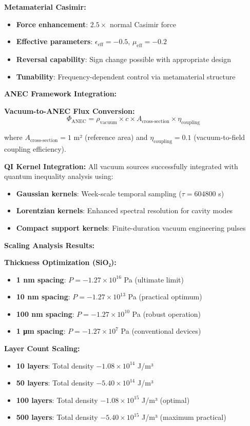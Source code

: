 \documentclass[11pt]{article}
\begin{document}
\textbf{Metamaterial Casimir:}
\begin{itemize}
    \item \textbf{Force enhancement}: $2.5 \times$ normal Casimir force
    \item \textbf{Effective parameters}: $\epsilon_{\text{eff}} = -0.5$, $\mu_{\text{eff}} = -0.2$
    \item \textbf{Reversal capability}: Sign change possible with appropriate design
    \item \textbf{Tunability}: Frequency-dependent control via metamaterial structure
\end{itemize}

\textbf{ANEC Framework Integration:}

\textbf{Vacuum-to-ANEC Flux Conversion:}
$$\Phi_{\text{ANEC}} = \rho_{\text{vacuum}} \times c \times A_{\text{cross-section}} \times \eta_{\text{coupling}}$$

where $A_{\text{cross-section}} = 1$ m² (reference area) and $\eta_{\text{coupling}} = 0.1$ (vacuum-to-field coupling efficiency).

\textbf{QI Kernel Integration:} All vacuum sources successfully integrated with quantum inequality analysis using:
\begin{itemize}
    \item \textbf{Gaussian kernels}: Week-scale temporal sampling ($\tau = 604800$ s)
    \item \textbf{Lorentzian kernels}: Enhanced spectral resolution for cavity modes
    \item \textbf{Compact support kernels}: Finite-duration vacuum engineering pulses
\end{itemize}

\textbf{Scaling Analysis Results:}

\textbf{Thickness Optimization (SiO₂):}
\begin{itemize}
    \item \textbf{1 nm spacing}: $P = -1.27 \times 10^{16}$ Pa (ultimate limit)
    \item \textbf{10 nm spacing}: $P = -1.27 \times 10^{13}$ Pa (practical optimum)
    \item \textbf{100 nm spacing}: $P = -1.27 \times 10^{10}$ Pa (robust operation)
    \item \textbf{1 μm spacing}: $P = -1.27 \times 10^7$ Pa (conventional devices)
\end{itemize}

\textbf{Layer Count Scaling:}
\begin{itemize}
    \item \textbf{10 layers}: Total density $-1.08 \times 10^{14}$ J/m³
    \item \textbf{50 layers}: Total density $-5.40 \times 10^{14}$ J/m³
    \item \textbf{100 layers}: Total density $-1.08 \times 10^{15}$ J/m³ (optimal)
    \item \textbf{500 layers}: Total density $-5.40 \times 10^{15}$ J/m³ (maximum practical)
\end{itemize}
\end{document}
